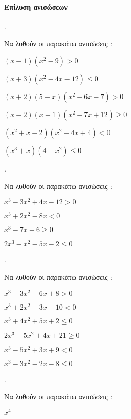 \documentclass[11pt,a4paper,twocolumn]{article}
\newcounter{askhsh}
\newcommand{\askhsh}{{\large\theaskhsh.}\ \addtocounter{askhsh}{1}}
\begin{document}
\paragraph{Επίλυση ανισώσεων}
\askhsh Να λυθούν οι παρακάτω ανισώσεις :
\begin{alist}
\item $(x-1)(x^2-9)>0$
\item $(x+3)(x^2-4x-12)\leq 0$
\item $ (x+2)(5-x)(x^2-6x-7)>0 $
\item $ (x-2)(x+1)(x^2-7x+12)\geq0 $
\item $ (x^2+x-2)(x^2-4x+4)<0 $
\item $ (x^3+x)(4-x^2)\leq 0 $
\end{alist}
\askhsh Να λυθούν οι παρακάτω ανισώσεις :
\begin{alist}
\item $ x^3-3x^2+4x-12>0 $
\item $ x^3+2x^2-8x<0 $
\item $ x^3-7x+6\geq 0 $
\item $ 2x^3-x^2-5x-2\leq 0 $
\end{alist}
\askhsh Να λυθούν οι παρακάτω ανισώσεις :
\begin{alist}
\item $ x^3-3x^2-6x+8>0 $
\item $ x^3+2x^2-3x-10<0 $
\item $ x^3+4x^2+5x+2\leq 0 $
\item $ 2x^3-5x^2+4x+21\geq 0 $
\item $ x^3-5x^2+3x+9<0 $
\item $ x^3-3x^2-2x-8\leq 0 $
\end{alist}
\askhsh Να λυθούν οι παρακάτω ανισώσεις :
\begin{alist}%
\item $ x^4 $
\end{alist}
\end{document}
